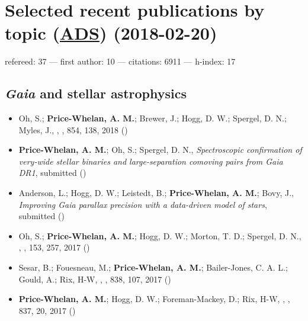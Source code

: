 \documentclass[12pt,letterpaper]{article}
\begin{document}
\section*{Selected recent publications by topic (\href{\adsurl}{ADS}) (2018-02-20)}
    refereed: 37 ---
    first author: 10 ---
    citations: 6911 ---
    h-index: 17

    \vspace{1em}

	\subsection*{\textbf{\textit{Gaia}} and stellar astrophysics}
	\begin{itemize}

\item Oh, S.; {\bf Price-Whelan, A. M.}; Brewer, J.; Hogg, D. W.; Spergel, D. N.; Myles, J.,
    ,
    \apj, 854, 138, 2018 ()

\item {\bf Price-Whelan, A. M.}; Oh, S.; Spergel, D. N.,
    {\it Spectroscopic confirmation of very-wide stellar binaries and large-separation comoving pairs from Gaia DR1},
    submitted ()

\item Anderson, L.; Hogg, D. W.; Leistedt, B.; {\bf Price-Whelan, A. M.}; Bovy, J.,
    {\it Improving Gaia parallax precision with a data-driven model of stars},
    submitted ()

\item Oh, S.; {\bf Price-Whelan, A. M.}; Hogg, D. W.; Morton, T. D.; Spergel, D. N.,
    ,
    \aj, 153, 257, 2017 ()

\item Sesar, B.; Fouesneau, M.; {\bf Price-Whelan, A. M.}; Bailer-Jones, C. A. L.; Gould, A.; Rix, H-W,
    ,
    \apj, 838, 107, 2017 ()

\item {\bf Price-Whelan, A. M.}; Hogg, D. W.; Foreman-Mackey, D.; Rix, H-W,
    ,
    \apj, 837, 20, 2017 ()

    \end{itemize}
\end{document}
